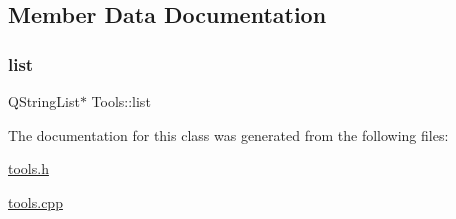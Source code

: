 \subsection{Member Data Documentation}
\mbox{\label{class_tools_a2d01c59dccd50660c98f9ad7ee13f5d0}} 
\subsubsection{\texorpdfstring{list}{list}}
{\footnotesize\ttfamily Q\+String\+List$\ast$ Tools\+::list\hspace{0.3cm}{\ttfamily [private]}}



The documentation for this class was generated from the following files\+:\begin{DoxyCompactItemize}
\item 
\mbox{\hyperlink{tools_8h}{tools.\+h}}\item 
\mbox{\hyperlink{tools_8cpp}{tools.\+cpp}}\end{DoxyCompactItemize}
